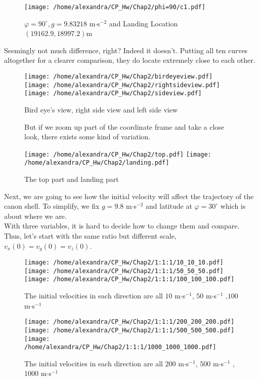 \documentclass[a4paper]{article}
\begin{document}
\begin{figure}[htbp]
\centering
\texttt{[image: /home/alexandra/CP\_Hw/Chap2/phi=90/c1.pdf]}
\caption{$\varphi=90^\circ,g=9.83218$ m$\cdot$s$^{-2}$ and Landing Location $(19162.9,18997.2)$m}
\end{figure}
\newpage
Seemingly not much difference, right? Indeed it doesn't. Putting all ten curves altogether for a clearer comparison, they do locate extremely close to each other.\\
\begin{figure}[htbp]
\centering
\texttt{[image: /home/alexandra/CP\_Hw/Chap2/birdeyeview.pdf]}
\texttt{[image: /home/alexandra/CP\_Hw/Chap2/rightsideview.pdf]}
\texttt{[image: /home/alexandra/CP\_Hw/Chap2/sideview.pdf]}
\caption{Bird eye's view, right side view and left side view}
\end{figure}
\begin{figure}[htbp]\sf
But if we zoom up part of the coordinate frame and take a close look, there exists some kind of variation.

\texttt{[image: /home/alexandra/CP\_Hw/Chap2/top.pdf]}
\texttt{[image: /home/alexandra/CP\_Hw/Chap2/landing.pdf]}
\rm\caption{The top part and landing part}
\end{figure}
\newpage
\sf Next, we are going to see how the initial velocity will affect the trajectory of the canon shell. To simplify, we fix $g=9.8$ m$\cdot$s$^{-2}$ and latitude at $\varphi=30^\circ$ which is about where we are.\\
With three variables, it is hard to decide how to change them and compare. Thus, let's start with the same ratio but different scale, $v_x(0)=v_y(0)=v_z(0)$.\\
\begin{figure}[htbp]
\centering
\texttt{[image: /home/alexandra/CP\_Hw/Chap2/1:1:1/10\_10\_10.pdf]}
\texttt{[image: /home/alexandra/CP\_Hw/Chap2/1:1:1/50\_50\_50.pdf]}
\texttt{[image: /home/alexandra/CP\_Hw/Chap2/1:1:1/100\_100\_100.pdf]}
\caption{The initial velocities in each direction are all $10$ m$\cdot$s$^{-1}$, $50$ m$\cdot$s$^{-1}$ ,$100$ m$\cdot$s$^{-1}$}
\end{figure}

\begin{figure}[htbp]
\centering
\texttt{[image: /home/alexandra/CP\_Hw/Chap2/1:1:1/200\_200\_200.pdf]}
\texttt{[image: /home/alexandra/CP\_Hw/Chap2/1:1:1/500\_500\_500.pdf]}
\texttt{[image: /home/alexandra/CP\_Hw/Chap2/1:1:1/1000\_1000\_1000.pdf]}
\caption{The initial velocities in each direction are all $200$ m$\cdot$s$^{-1}$, $500$ m$\cdot$s$^{-1}$ ,$1000$ m$\cdot$s$^{-1}$}
\end{figure}
\end{document}
